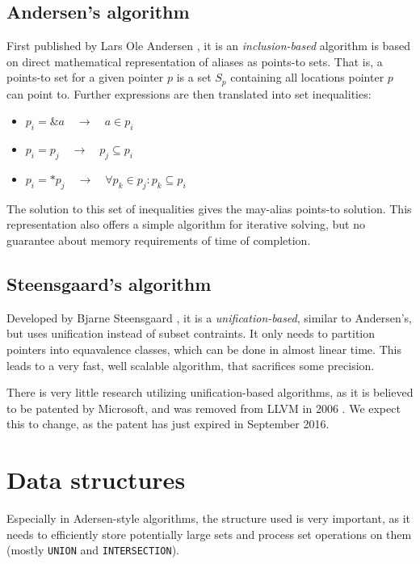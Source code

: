\subsection{Andersen's algorithm}

First published by Lars Ole Andersen \cite{Andersen94}, it is an {\it
inclusion-based} algorithm is based on direct mathematical representation of
aliases as points-to sets. That is, a points-to set for a given pointer $p$ is a
set $S_p$ containing all locations pointer $p$ can point to.  Further
expressions are then translated into set inequalities:

\begin{itemize}
	\item $p_i = \&a \quad \to \quad a \in p_i$
	\item $p_i = p_j \quad \to \quad p_j \subseteq p_i$ 
	\item $p_i = *p_j \quad \to \quad \forall p_k \in p_j : p_k \subseteq p_i$
\end{itemize}

The solution to this set of inequalities gives the may-alias points-to
solution. This representation also offers a simple algorithm for iterative
solving, but no guarantee about memory requirements of time of completion.

\subsection{Steensgaard's algorithm}

Developed by Bjarne Steensgaard \cite{Steensgaard96}, it is  a {\it
unification-based}, similar to Andersen's, but uses unification instead of
subset contraints. It only needs to partition pointers into equavalence
classes, which can be done in almost linear time. This leads to a very fast,
well scalable algorithm, that sacrifices some precision.

There is very little research utilizing unification-based algorithms, as it is
believed to be patented by Microsoft\cite{patent:steensgaard}, and was removed from LLVM in 2006
\cite{LLVM:DSA:Remove}. We expect this to change, as the patent has just expired
in September 2016.


\section{Data structures}

Especially in Adersen-style algorithms, the structure used is very important, as
it needs to efficiently store potentially large sets and process set operations
on them (mostly {\tt UNION} and {\tt INTERSECTION}).

